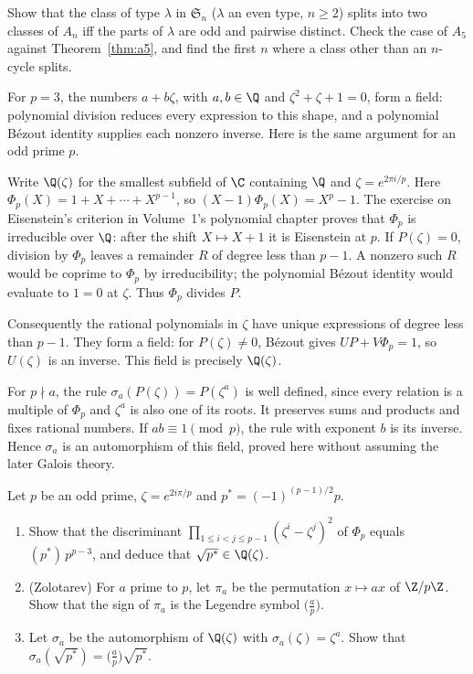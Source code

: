 \begin{exercise}[$\star\star\star$]\label{ex:split}
Show that the class of type $\lambda$ in $\mathfrak S_n$ ($\lambda$ an even type, $n\ge2$) splits into two classes of $A_n$ iff the parts of $\lambda$ are odd and pairwise distinct. Check the case of $A_5$ against Theorem~\ref{thm:a5}, and find the first $n$ where a class other than an $n$-cycle splits.
\end{exercise}

\begin{reminder}
For $p=3$, the numbers $a+b\zeta$, with $a,b\in\Q$ and $\zeta^2+\zeta+1=0$, form a field: polynomial division reduces every expression to this shape, and a polynomial B\'ezout identity supplies each nonzero inverse. Here is the same argument for an odd prime $p$.

Write $\Q(\zeta)$ for the smallest subfield of $\C$ containing $\Q$ and $\zeta=e^{2\pi i/p}$. Here $\Phi_p(X)=1+X+\cdots+X^{p-1}$, so $(X-1)\Phi_p(X)=X^p-1$. The exercise on Eisenstein's criterion in Volume~1's polynomial chapter proves that $\Phi_p$ is irreducible over $\Q$: after the shift $X\mapsto X+1$ it is Eisenstein at $p$. If $P(\zeta)=0$, division by $\Phi_p$ leaves a remainder $R$ of degree less than $p-1$. A nonzero such $R$ would be coprime to $\Phi_p$ by irreducibility; the polynomial B\'ezout identity would evaluate to $1=0$ at $\zeta$. Thus $\Phi_p$ divides $P$.

Consequently the rational polynomials in $\zeta$ have unique expressions of degree less than $p-1$. They form a field: for $P(\zeta)\ne0$, B\'ezout gives $UP+V\Phi_p=1$, so $U(\zeta)$ is an inverse. This field is precisely $\Q(\zeta)$.

For $p\nmid a$, the rule $\sigma_a(P(\zeta))=P(\zeta^a)$ is well defined, since every relation is a multiple of $\Phi_p$ and $\zeta^a$ is also one of its roots. It preserves sums and products and fixes rational numbers. If $ab\equiv1\pmod p$, the rule with exponent $b$ is its inverse. Hence $\sigma_a$ is an automorphism of this field, proved here without assuming the later Galois theory.
\end{reminder}

\begin{exercise}[$\star\star\star$]\label{pb:discphi}
Let $p$ be an odd prime, $\zeta=e^{2i\pi/p}$ and $p^*=(-1)^{(p-1)/2}p$.
\begin{enumerate}[label=(\alph*)]
\item Show that the discriminant $\prod_{1\le i<j\le p-1}(\zeta^i-\zeta^j)^2$ of $\Phi_p$ equals $(p^*)\,p^{p-3}$, and
deduce that $\sqrt{p^*}\in\Q(\zeta)$.
\item (Zolotarev) For $a$ prime to $p$, let $\pi_a$ be the permutation $x\mapsto ax$ of $\Z/p\Z$. Show that the sign of
$\pi_a$ is the Legendre symbol $\bigl(\frac ap\bigr)$.
\item Let $\sigma_a$ be the automorphism of $\Q(\zeta)$ with $\sigma_a(\zeta)=\zeta^a$. Show that
$\sigma_a(\sqrt{p^*})=\bigl(\frac ap\bigr)\sqrt{p^*}$.
\end{enumerate}
\end{exercise}

